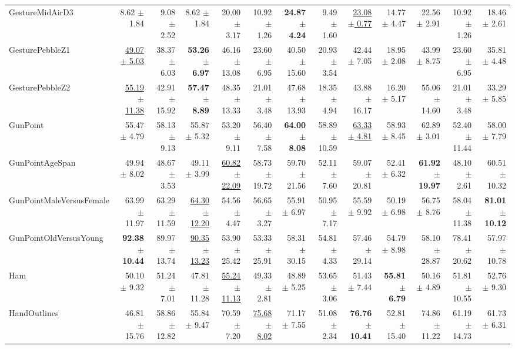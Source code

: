 \begin{landscape}
\begin{longtable}{lrrrrrrrrrrrr}
GestureMidAirD3 & 8.62 $\pm$ 1.84 & 9.08 $\pm$ 2.52 & 8.62 $\pm$ 1.84 & 20.00 $\pm$ 3.17 & 10.92 $\pm$ 1.26 & \textbf{24.87 $\pm$ 4.24} & 9.49 $\pm$ 1.60 & \underline{23.08 $\pm$ 0.77} & 14.77 $\pm$ 4.47 & 22.56 $\pm$ 2.91 & 10.92 $\pm$ 1.26 & 18.46 $\pm$ 2.61 \\
GesturePebbleZ1 & \underline{49.07 $\pm$ 5.03} & 38.37 $\pm$ 6.03 & \textbf{53.26 $\pm$ 6.97} & 46.16 $\pm$ 13.08 & 23.60 $\pm$ 6.95 & 40.50 $\pm$ 15.60 & 20.93 $\pm$ 3.54 & 42.44 $\pm$ 7.05 & 18.95 $\pm$ 2.08 & 43.99 $\pm$ 8.75 & 23.60 $\pm$ 6.95 & 35.81 $\pm$ 4.48 \\
GesturePebbleZ2 & \underline{55.19 $\pm$ 11.38} & 42.91 $\pm$ 15.92 & \textbf{57.47 $\pm$ 8.89} & 48.35 $\pm$ 13.33 & 21.01 $\pm$ 3.48 & 47.68 $\pm$ 13.93 & 18.35 $\pm$ 4.94 & 43.88 $\pm$ 16.17 & 16.20 $\pm$ 5.17 & 55.06 $\pm$ 14.60 & 21.01 $\pm$ 3.48 & 33.29 $\pm$ 5.85 \\
GunPoint & 55.47 $\pm$ 4.79 & 58.13 $\pm$ 9.13 & 55.87 $\pm$ 5.32 & 53.20 $\pm$ 9.11 & 56.40 $\pm$ 7.58 & \textbf{64.00 $\pm$ 8.08} & 58.89 $\pm$ 10.59 & \underline{63.33 $\pm$ 4.81} & 58.93 $\pm$ 8.45 & 62.89 $\pm$ 3.01 & 52.40 $\pm$ 11.44 & 58.00 $\pm$ 7.79 \\
GunPointAgeSpan & 49.94 $\pm$ 8.02 & 48.67 $\pm$ 3.53 & 49.11 $\pm$ 3.99 & \underline{60.82 $\pm$ 22.09} & 58.73 $\pm$ 19.72 & 59.70 $\pm$ 21.56 & 52.11 $\pm$ 7.60 & 59.07 $\pm$ 20.81 & 52.41 $\pm$ 6.32 & \textbf{61.92 $\pm$ 19.97} & 48.10 $\pm$ 2.61 & 60.51 $\pm$ 10.32 \\
GunPointMaleVersusFemale & 63.99 $\pm$ 11.97 & 63.29 $\pm$ 11.59 & \underline{64.30 $\pm$ 12.20} & 54.56 $\pm$ 4.47 & 56.65 $\pm$ 3.27 & 55.91 $\pm$ 6.97 & 50.95 $\pm$ 7.17 & 55.59 $\pm$ 9.92 & 50.19 $\pm$ 6.98 & 56.75 $\pm$ 8.76 & 58.04 $\pm$ 11.38 & \textbf{81.01 $\pm$ 10.12} \\
GunPointOldVersusYoung & \textbf{92.38 $\pm$ 10.44} & 89.97 $\pm$ 13.74 & \underline{90.35 $\pm$ 13.23} & 53.90 $\pm$ 25.42 & 53.33 $\pm$ 25.91 & 58.31 $\pm$ 30.15 & 54.81 $\pm$ 4.33 & 57.46 $\pm$ 29.14 & 54.79 $\pm$ 8.98 & 58.10 $\pm$ 28.87 & 78.41 $\pm$ 20.62 & 57.97 $\pm$ 10.78 \\
Ham & 50.10 $\pm$ 9.32 & 51.24 $\pm$ 7.01 & 47.81 $\pm$ 11.28 & \underline{55.24 $\pm$ 11.13} & 49.33 $\pm$ 2.81 & 48.89 $\pm$ 5.25 & 53.65 $\pm$ 3.06 & 51.43 $\pm$ 7.44 & \textbf{55.81 $\pm$ 6.79} & 50.16 $\pm$ 4.89 & 51.81 $\pm$ 10.55 & 52.76 $\pm$ 9.30 \\
HandOutlines & 46.81 $\pm$ 15.76 & 58.86 $\pm$ 12.82 & 55.84 $\pm$ 9.47 & 70.59 $\pm$ 7.20 & \underline{75.68 $\pm$ 8.02} & 71.17 $\pm$ 7.55 & 51.08 $\pm$ 2.34 & \textbf{76.76 $\pm$ 10.41} & 52.81 $\pm$ 15.40 & 74.86 $\pm$ 11.22 & 61.19 $\pm$ 14.73 & 61.73 $\pm$ 6.31 \\

\end{longtable}
\end{landscape}
